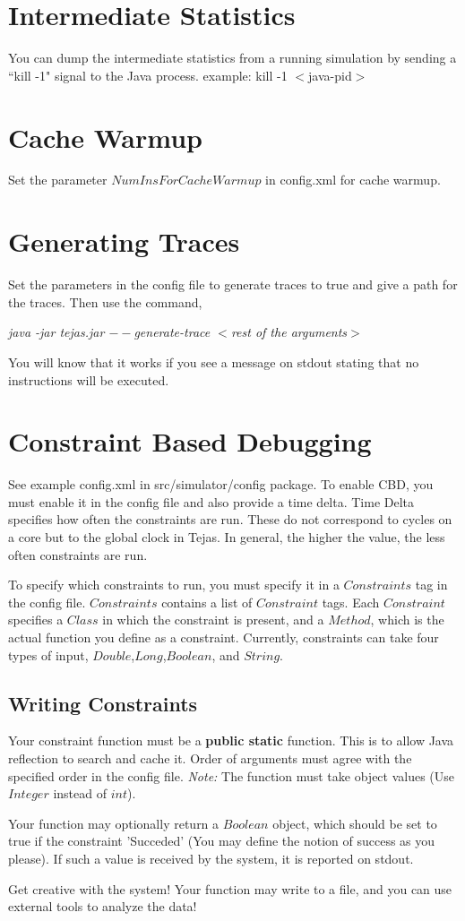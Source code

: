 \documentclass[12pt]{article}
\begin{document}
\section{Intermediate Statistics}
You can dump the intermediate statistics from a running simulation by 
sending a ``kill -1" signal to the Java process. 
example: kill -1 $<$java-pid$>$

\section{Cache Warmup}
Set the parameter $NumInsForCacheWarmup$ in config.xml for cache warmup.

\section{Generating Traces}
Set the parameters in the config file to generate traces to true and give a path for the traces. Then use the command,

\textit{java -jar tejas.jar $--$generate-trace $<$rest of the arguments$>$}

You will know that it works if you see a message on stdout stating that no instructions will be executed. 

\section{Constraint Based Debugging}

See example config.xml in src/simulator/config package. To enable CBD, you must enable it in the config file and also provide a time delta. Time Delta specifies how often the constraints are run. These do not correspond to cycles on a core but to the global clock in Tejas. In general, the higher the value, the less often constraints are run.

To specify which constraints to run, you must specify it in a $Constraints$ tag in the config file. $Constraints$ contains a list of $Constraint$ tags. Each $Constraint$ specifies a $Class$ in which the constraint is present, and a $Method$, which is the actual function you define as a constraint. Currently, constraints can take four types of input, $Double$,$Long$,$Boolean$, and $String$.

\subsection{Writing Constraints}

Your constraint function must be a \textbf{public static} function. This is to allow Java reflection to search and cache it. Order of arguments must agree with the specified order in the config file. \textit{Note:} The function must take object values (Use $Integer$ instead of $int$).

Your function may optionally return a $Boolean$ object, which should be set to true if the constraint 'Succeded' (You may define the notion of success as you please). If such a value is received by the system, it is reported on stdout.

Get creative with the system! Your function may write to a file, and you can use external tools to analyze the data!
\end{document}
